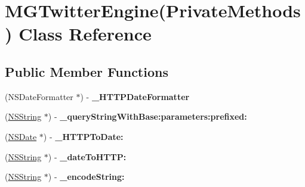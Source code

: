\hypertarget{interface_m_g_twitter_engine_07_private_methods_08}{
\section{\-M\-G\-Twitter\-Engine(\-Private\-Methods) \-Class \-Reference}
\label{interface_m_g_twitter_engine_07_private_methods_08}
}
\subsection*{\-Public \-Member \-Functions}
\begin{DoxyCompactItemize}
\item 
\hypertarget{interface_m_g_twitter_engine_07_private_methods_08_aaef5aeb9de9dab3e8669c76e8f6db246}{
(\-N\-S\-Date\-Formatter $\ast$) -\/ {\bfseries \-\_\-\-H\-T\-T\-P\-Date\-Formatter}}
\label{interface_m_g_twitter_engine_07_private_methods_08_aaef5aeb9de9dab3e8669c76e8f6db246}

\item 
\hypertarget{interface_m_g_twitter_engine_07_private_methods_08_aaac37194488c1edd1d960b873b68f69c}{
(\hyperlink{class_n_s_string}{\-N\-S\-String} $\ast$) -\/ {\bfseries \-\_\-query\-String\-With\-Base\-:parameters\-:prefixed\-:}}
\label{interface_m_g_twitter_engine_07_private_methods_08_aaac37194488c1edd1d960b873b68f69c}

\item 
\hypertarget{interface_m_g_twitter_engine_07_private_methods_08_a63e5d7397680b923843dc45578ce5dce}{
(\hyperlink{class_n_s_date}{\-N\-S\-Date} $\ast$) -\/ {\bfseries \-\_\-\-H\-T\-T\-P\-To\-Date\-:}}
\label{interface_m_g_twitter_engine_07_private_methods_08_a63e5d7397680b923843dc45578ce5dce}

\item 
\hypertarget{interface_m_g_twitter_engine_07_private_methods_08_a61eebf5299b79da4d6b9bd411e25c457}{
(\hyperlink{class_n_s_string}{\-N\-S\-String} $\ast$) -\/ {\bfseries \-\_\-date\-To\-H\-T\-T\-P\-:}}
\label{interface_m_g_twitter_engine_07_private_methods_08_a61eebf5299b79da4d6b9bd411e25c457}

\item 
\hypertarget{interface_m_g_twitter_engine_07_private_methods_08_abb4a3f85ee995bc91315d70bd280ae8d}{
(\hyperlink{class_n_s_string}{\-N\-S\-String} $\ast$) -\/ {\bfseries \-\_\-encode\-String\-:}}
\label{interface_m_g_twitter_engine_07_private_methods_08_abb4a3f85ee995bc91315d70bd280ae8d}


\end{DoxyCompactItemize}

